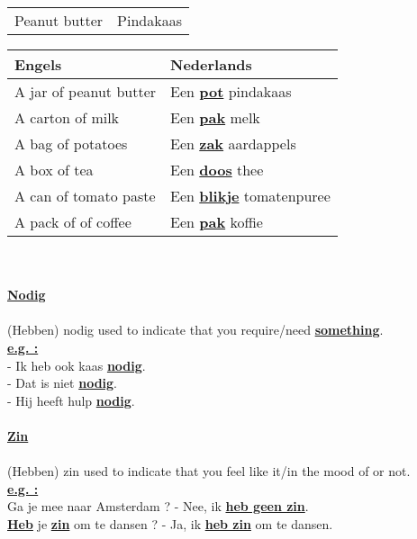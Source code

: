 \documentclass[a4paper,14pt]{extarticle}
\newcommand{\emp}[1]{\underline{\textbf{#1}}}
\begin{document}
\begin{paracol}{2}
\begin{tabularx}{200pt}{ p{100pt} p{100pt} }
 Peanut butter & Pindakaas \\
\end{tabularx}
\switchcolumn
\begin{tabularx}{200pt}{ p{100pt} p{100pt} }
 \hline
 Engels & Nederlands\\
 \hline
 A jar of peanut butter & Een \emp{pot} pindakaas \\
 A carton of milk & Een \emp{pak} melk \\
 A bag of potatoes & Een \emp{zak} aardappels \\
 A box of tea & Een \emp{doos} thee \\
 A can of tomato paste & Een \emp{blikje} tomatenpuree \\
 A pack of of coffee & Een \emp{pak} koffie \\
\end{tabularx}
\hfill \\ \\
\emp{Nodig} \\ \\
(Hebben) nodig used to indicate that you require/need \emp{something}. \\
\emp{e.g. : } \\
- Ik heb ook kaas \emp{nodig}. \\
- Dat is niet \emp{nodig}. \\
- Hij heeft hulp \emp{nodig}. \\ \\
\emp {Zin} \\ \\
(Hebben) zin used to indicate that you feel like it/in the mood of or not. \\
\emp{e.g. : } \\
Ga je mee naar Amsterdam ? - Nee, ik \emp{heb geen zin}. \\
\emp{Heb} je \emp{zin} om te dansen ? - Ja, ik \emp{heb zin} om te dansen. \\
\end{paracol}
\end{document}
